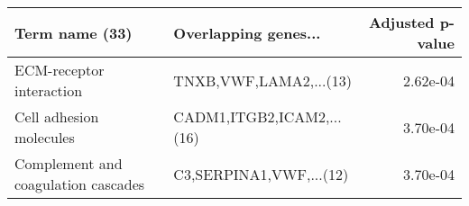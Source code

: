 \begin{tabular}{llr}
\toprule
                     Term name (33) &      Overlapping genes... &  Adjusted p-value \\
\midrule
           ECM-receptor interaction &    TNXB,VWF,LAMA2,...(13) &          2.62e-04 \\
            Cell adhesion molecules & CADM1,ITGB2,ICAM2,...(16) &          3.70e-04 \\
Complement and coagulation cascades &   C3,SERPINA1,VWF,...(12) &          3.70e-04 \\
\bottomrule
\end{tabular}
